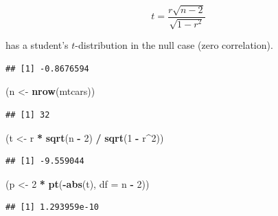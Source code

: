 \documentclass[
]{book}
\newenvironment{Shaded}{\begin{snugshade}}{\end{snugshade}}
\newcommand{\AttributeTok}[1]{\textcolor[rgb]{0.13,0.29,0.53}{#1}}
\newcommand{\DecValTok}[1]{\textcolor[rgb]{0.00,0.00,0.81}{#1}}
\newcommand{\FunctionTok}[1]{\textcolor[rgb]{0.13,0.29,0.53}{\textbf{#1}}}
\newcommand{\NormalTok}[1]{#1}
\newcommand{\OtherTok}[1]{\textcolor[rgb]{0.56,0.35,0.01}{#1}}
\newcommand{\SpecialCharTok}[1]{\textcolor[rgb]{0.81,0.36,0.00}{\textbf{#1}}}
\begin{document}
\[t = \frac{r \sqrt{n-2}}{\sqrt{1-r^2}}\]

has a student's \(t\)-distribution in the null case (zero correlation).

\begin{Shaded}
\end{Shaded}

\begin{verbatim}
## [1] -0.8676594
\end{verbatim}

\begin{Shaded}
\begin{Highlighting}[]
\NormalTok{(n }\OtherTok{\textless{}{-}} \FunctionTok{nrow}\NormalTok{(mtcars))}
\end{Highlighting}
\end{Shaded}

\begin{verbatim}
## [1] 32
\end{verbatim}

\begin{Shaded}
\begin{Highlighting}[]
\NormalTok{(t }\OtherTok{\textless{}{-}}\NormalTok{ r }\SpecialCharTok{*} \FunctionTok{sqrt}\NormalTok{(n }\SpecialCharTok{{-}} \DecValTok{2}\NormalTok{) }\SpecialCharTok{/} \FunctionTok{sqrt}\NormalTok{(}\DecValTok{1} \SpecialCharTok{{-}}\NormalTok{ r}\SpecialCharTok{\^{}}\DecValTok{2}\NormalTok{))}
\end{Highlighting}
\end{Shaded}

\begin{verbatim}
## [1] -9.559044
\end{verbatim}

\begin{Shaded}
\begin{Highlighting}[]
\NormalTok{(p }\OtherTok{\textless{}{-}} \DecValTok{2} \SpecialCharTok{*} \FunctionTok{pt}\NormalTok{(}\SpecialCharTok{{-}}\FunctionTok{abs}\NormalTok{(t), }\AttributeTok{df =}\NormalTok{ n }\SpecialCharTok{{-}} \DecValTok{2}\NormalTok{))}
\end{Highlighting}
\end{Shaded}

\begin{verbatim}
## [1] 1.293959e-10
\end{verbatim}
\end{document}
